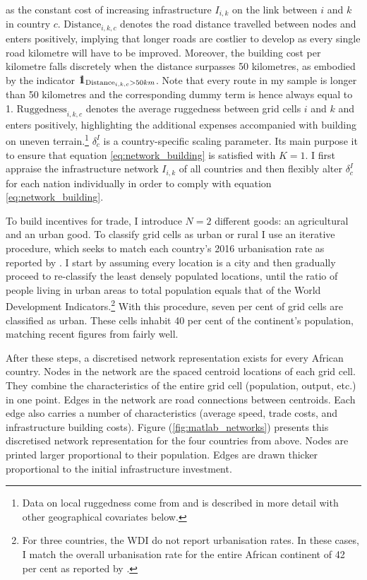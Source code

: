 \documentclass[11pt, oneside]{article}   	%
\def\one{\mbox{1\hspace{-4.25pt}\fontsize{12}{14.4}\selectfont\textrm{1}}} %
\let\oldref\ref
\renewcommand{\ref}[1]{(\oldref{#1})}
\begin{document}
as the constant cost of increasing infrastructure $I_{i,k}$ on the link between $i$ and $k$ in country $c$. $\textrm{Distance}_{i,k,c}$ denotes the road distance travelled between nodes and enters positively, implying that longer roads are costlier to develop as every single road kilometre will have to be improved. Moreover, the building cost per kilometre falls discretely when the distance surpasses 50 kilometres, as embodied by the indicator $\one_{\textrm{Distance}_{i,k,c} > 50km}$. Note that every route in my sample is longer than 50 kilometres and the corresponding dummy term is hence always equal to 1. $\textrm{Ruggedness}_{i,k,c}$ denotes the average ruggedness between grid cells $i$ and $k$ and enters positively, highlighting the additional expenses accompanied with building on uneven terrain.\footnote{Data on local ruggedness come from \cite{Henderson_GlobalSpatialDistribution_2018} and is described in more detail with other geographical covariates below.} $\delta_{c}^{I}$ is a country-specific scaling parameter. Its main purpose it to ensure that equation \eqref{eq:network_building} is satisfied with $K=1$. I first appraise the infrastructure network $I_{i,k}$ of all countries and then flexibly alter $\delta_{c}^{I}$ for each nation individually in order to comply with equation \eqref{eq:network_building}.

To build incentives for trade, I introduce $N=2$ different goods: an agricultural and an urban good. To classify grid cells as urban or rural I use an iterative procedure, which seeks to match each country's 2016 urbanisation rate as reported by \cite{TheWorldBank_WorldBankAnnual_2017}. I start by assuming every location is a city and then gradually proceed to re-classify the least densely populated locations, until the ratio of people living in urban areas to total population equals that of the World Development Indicators.\footnote{For three countries, the WDI do not report urbanisation rates. In these cases, I match the overall urbanisation rate for the entire African continent of 42 per cent as reported by \cite{Lall_AfricaCitiesOpening_2017}.} With this procedure, seven per cent of grid cells are classified as urban. These cells inhabit 40 per cent of the continent's population, matching recent figures from \cite{Lall_AfricaCitiesOpening_2017} fairly well.

After these steps, a discretised network representation exists for every African country. Nodes in the network are the spaced centroid locations of each grid cell. They combine the characteristics of the entire grid cell (population, output, etc.) in one point. Edges in the network are road connections between centroids. Each edge also carries a number of characteristics (average speed, trade costs, and infrastructure building costs). Figure \ref{fig:matlab_networks} presents this discretised network representation for the four countries from above. Nodes are printed larger proportional to their population. Edges are drawn thicker proportional to the initial infrastructure investment.
\end{document}
